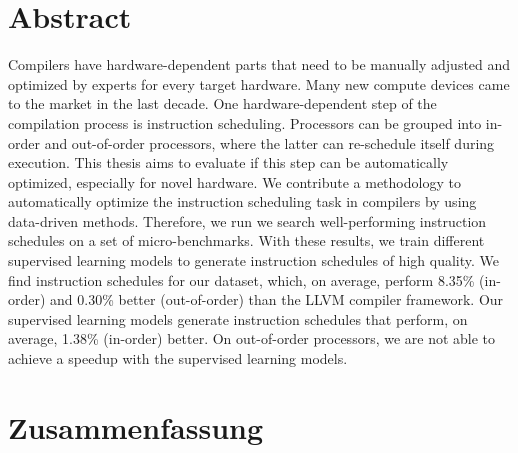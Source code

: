 \chapter*{Abstract}
Compilers have hardware-dependent parts that need to be manually adjusted and optimized by experts for every target hardware.
Many new compute devices came to the market in the last decade.
One hardware-dependent step of the compilation process is instruction scheduling.
Processors can be grouped into in-order and out-of-order processors, where the latter can re-schedule itself during execution.
This thesis aims to evaluate if this step can be automatically optimized, especially for novel hardware.
We contribute a methodology to automatically optimize the instruction scheduling task in compilers by using data-driven methods.
Therefore, we run we search well-performing instruction schedules on a set of micro-benchmarks.
With these results, we train different supervised learning models to generate instruction schedules of high quality.
We find instruction schedules for our dataset, which, on average, perform 8.35\% (in-order) and 0.30\% better (out-of-order) than the LLVM compiler framework.
Our supervised learning models generate instruction schedules that perform, on average, 1.38\% (in-order) better.
On out-of-order processors, we are not able to achieve a speedup with the supervised learning models.

\chapter*{Zusammenfassung}
